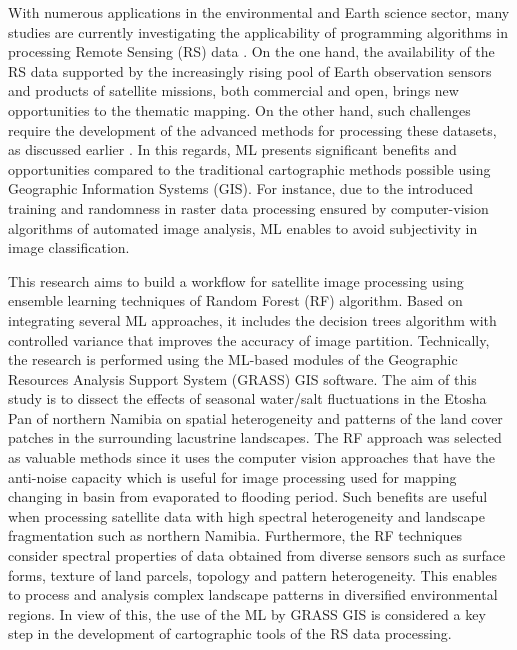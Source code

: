 \documentclass[draft]{agujournal2019}
\begin{document}
With numerous applications in the environmental and Earth science sector, many studies are currently investigating the applicability of programming algorithms in processing Remote Sensing (RS) data \cite{10080513,10334172,Lemenkova202227,9964623,jimaging9050098,9393066}. On the one hand, the availability of the RS data supported by the increasingly rising pool of Earth observation sensors and products of satellite missions, both commercial and open, brings new opportunities to the thematic mapping. On the other hand, such challenges require the development of the advanced methods for processing these datasets, as discussed earlier \cite{JASIEWICZ20111525}. In this regards, ML presents significant benefits and opportunities compared to the traditional cartographic methods possible using Geographic Information Systems (GIS). For instance, due to the introduced training and randomness in raster data processing ensured by computer-vision algorithms of automated image analysis, ML enables to avoid subjectivity in image classification. 

This research aims to build a workflow for satellite image processing using ensemble learning techniques of Random Forest (RF) algorithm. Based on integrating several ML approaches, it includes the decision trees algorithm with controlled variance that improves the accuracy of image partition. Technically, the research is performed using the ML-based modules of the Geographic Resources Analysis Support System (GRASS) GIS software. The aim of this study is to dissect the effects of seasonal water/salt fluctuations in the Etosha Pan of northern Namibia on spatial heterogeneity and patterns of the land cover patches in the surrounding lacustrine landscapes. The RF approach was selected as valuable methods since it uses the computer vision approaches that have the anti-noise capacity which is useful for image processing used for mapping changing in basin from evaporated to flooding period. Such benefits are useful when processing satellite data with high spectral heterogeneity and landscape fragmentation such as northern Namibia. Furthermore, the RF techniques consider spectral properties of data obtained from diverse sensors such as surface forms, texture of land parcels, topology and pattern heterogeneity. This enables to process and analysis complex landscape patterns in diversified environmental regions. In view of this, the use of the ML by GRASS GIS is considered a key step in the development of cartographic tools of the RS data processing.
\end{document}
